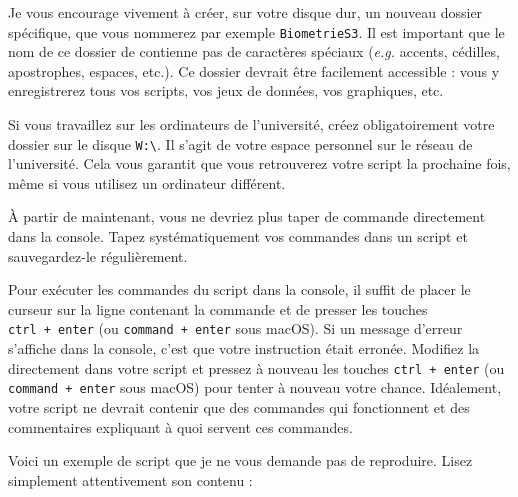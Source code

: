 \documentclass[
  letterpaper,
  DIV=11,
  numbers=noendperiod]{scrreprt}
\begin{document}
\begin{tcolorbox}[enhanced jigsaw, bottomtitle=1mm, title=\textcolor{quarto-callout-important-color}{\faExclamation}\hspace{0.5em}{Où sauvegarder vos scripts ? {\faIcon{regular}}}, breakable, opacitybacktitle=0.6, coltitle=black, opacityback=0, toprule=.15mm, toptitle=1mm, titlerule=0mm, colback=white, rightrule=.15mm, arc=.35mm, leftrule=.75mm, bottomrule=.15mm, left=2mm, colframe=quarto-callout-important-color-frame, colbacktitle=quarto-callout-important-color!10!white]
Je vous encourage vivement à créer, sur votre disque dur, un nouveau
dossier spécifique, que vous nommerez par exemple \texttt{BiometrieS3}.
Il est important que le nom de ce dossier de contienne pas de caractères
spéciaux (\emph{e.g.} accents, cédilles, apostrophes, espaces, etc.). Ce
dossier devrait être facilement accessible : vous y enregistrerez tous
vos scripts, vos jeux de données, vos graphiques, etc.

Si vous travaillez sur les ordinateurs de l'université, créez
{obligatoirement} votre dossier sur le disque
\texttt{W:\textbackslash{}}. Il s'agit de votre espace personnel sur le
réseau de l'université. Cela vous garantit que vous retrouverez votre
script la prochaine fois, même si vous utilisez un ordinateur différent.
\end{tcolorbox}

À partir de maintenant, vous ne devriez plus taper de commande
directement dans la console. Tapez systématiquement vos commandes dans
un script et sauvegardez-le régulièrement.

Pour exécuter les commandes du script dans la console, il suffit de
placer le curseur sur la ligne contenant la commande et de presser les
touches \texttt{ctrl\ +\ enter} (ou \texttt{command\ +\ enter} sous
macOS). Si un message d'erreur s'affiche dans la console, c'est que
votre instruction était erronée. Modifiez la directement dans votre
script et pressez à nouveau les touches \texttt{ctrl\ +\ enter} (ou
\texttt{command\ +\ enter} sous macOS) pour tenter à nouveau votre
chance. Idéalement, votre script ne devrait contenir que des commandes
qui fonctionnent et des commentaires expliquant à quoi servent ces
commandes.

Voici un exemple de script que je ne vous demande pas de reproduire.
Lisez simplement attentivement son contenu :
\end{document}
